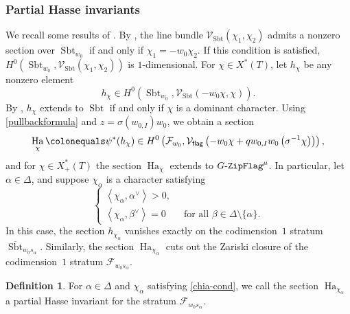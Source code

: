 \documentclass[11pt]{amsart}
\numberwithin{equation}{section}
\theoremstyle{definition}
\newtheorem{definition}[theorem]{Definition}
\theoremstyle{remark}
\newcommand{\flag}{\mathsf{flag}}
\newcommand{\GF}{\mathop{\text{$G$-{\tt ZipFlag}}}\nolimits}
\newcommand{\Fcal}{{\mathcal F}}
\newcommand{\Vcal}{{\mathcal V}}
\DeclareMathOperator{\Sbt}{Sbt}
\DeclareMathOperator{\Ha}{Ha}
\begin{document}
\subsubsection{Partial Hasse invariants}\label{sec-partialHasse}
We recall some results of \cite{Imai-Koskivirta-partial-Hasse}. By \cite[Theorem 2.2.1(a)]{Goldring-Koskivirta-Strata-Hasse}, the line bundle $\Vcal_{\Sbt}(\chi_1,\chi_2)$ admits a nonzero section over $\Sbt_{w_0}$ if and only if $\chi_1=-w_0\chi_2$. If this condition is satisfied, $H^0(\Sbt_{w_0}, \Vcal_{\Sbt}(\chi_1,\chi_2))$ is $1$-dimensional. For $\chi\in X^*(T)$, let $h_\chi$ be any nonzero element
\begin{equation}\label{hchi}
  h_\chi\in H^0\left(\Sbt_{w_0}, \Vcal_{\Sbt}(-w_0\chi,\chi)\right).
\end{equation}
By \cite[Theorem 2.2.1(c)]{Goldring-Koskivirta-Strata-Hasse}, $h_\chi$ extends to $\Sbt$ if and only if $\chi$ is a dominant character. Using \eqref{pullbackformula} and $z=\sigma(w_{0,I})w_0$, we obtain a section
\begin{equation}
\Ha_{\chi}\colonequals \psi^*(h_\chi)\in H^0\left(\Fcal_{w_0},\Vcal_{\flag}\left(-w_0\chi+qw_{0,I}w_0\left(\sigma^{-1}\chi\right)\right)\right), 
\end{equation}
and for $\chi\in X^*_+(T)$ the section $\Ha_{\chi}$ extends to $\GF^\mu$. In particular, let $\alpha\in \Delta$, and suppose $\chi_{\alpha}$ is a character satisfying 
\begin{equation}\label{chia-cond}
\begin{cases}
\left\langle \chi_\alpha, \alpha^{\vee} \right\rangle>0, & \\
\left\langle \chi_\alpha, \beta^{\vee} \right\rangle=0 & \ \textrm{ for all } \beta\in \Delta\setminus \{\alpha\}.
\end{cases}
\end{equation}
In this case, the section $h_{\chi_\alpha}$ vanishes exactly on the codimension~$1$ stratum $\overline{\Sbt}_{w_0s_\alpha}$. Similarly, the section $\Ha_{\chi_{\alpha}}$ cuts out the Zariski closure of the codimension~$1$ stratum $\Fcal_{w_0s_\alpha}$.


\begin{definition}\label{partial-Hasse-def}
For $\alpha\in \Delta$ and $\chi_\alpha$ satisfying \eqref{chia-cond}, we call the section $\Ha_{\chi_{\alpha}}$ a partial Hasse invariant for the stratum $\Fcal_{w_0 s_\alpha}$.
\end{definition}
\end{document}
